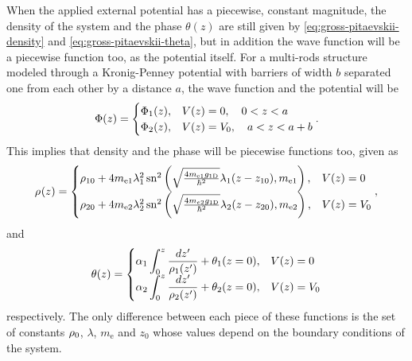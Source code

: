 When the applied external potential has a piecewise, constant magnitude, the density of the system
and the phase $\theta(z)$ are still given by \eqref{eq:gross-pitaevskii-density} and \eqref{eq:gross-pitaevskii-theta}, but in
addition the wave function will be a piecewise function too, as the potential itself. For a
multi-rods structure modeled through a Kronig-Penney potential with barriers of width $b$ separated one from each other by a distance $a$, the wave function and the potential will be
%
\begin{align}
	\label{eq:gross-pitaevskii-kronig-penney-wavefunction}
	\gpwavefunc(z) = \begin{cases}
		\gpwavefunc_1(z), & V(z) = 0, \quad 0 < z < a \\
		\gpwavefunc_2(z), & V(z) = V_0, \quad a < z < a + b
	\end{cases}.
\end{align}
%
This implies that density and the phase will be piecewise functions too, given as
%
\begin{align}
	\label{eq:gross-pitaevskii-kronig-penney-density}
	\gprho(z) = \begin{cases}
		\gprho[10] + 4 m_{\mathrm{e}1} \lambda^2_{1} \, \jacobisn^2 \left( \sqrt{\frac{4 m_{\mathrm{e}1} \gonedim}{\hbar^2}} \lambda_{1} (z - z_{10}), m_{\mathrm{e}1}\right), & V(z) = 0 \\
		\gprho[20] + 4 m_{\mathrm{e}2} \lambda^2_{2} \, \jacobisn^2 \left( \sqrt{\frac{4 m_{e2} \gonedim}{\hbar^2}} \lambda_2 (z - z_{20}), m_{\mathrm{e}2}\right), & V(z) = V_0
	\end{cases},
\end{align}
%
and
%
\begin{align}
	\label{eq:gross-pitaevskii-kronig-penney-theta}
	\theta(z) = \begin{cases}
		\displaystyle \alpha_{1} \int_{0}^{z} \frac{dz'}{\gprho[1](z')} + \theta_1(z=0), & V(z) = 0 \\
		\displaystyle \alpha_{2} \int_{0}^{z} \frac{dz'}{\gprho[2](z')} + \theta_2(z=0), & V(z) = V_0
	\end{cases}
\end{align}
%
respectively. The only difference between each piece of these functions is the set of constants
$\gprho[0]$, $\lambda$, $m_{\mathrm{e}}$ and $z_0$ whose values depend on the boundary conditions of the system.

